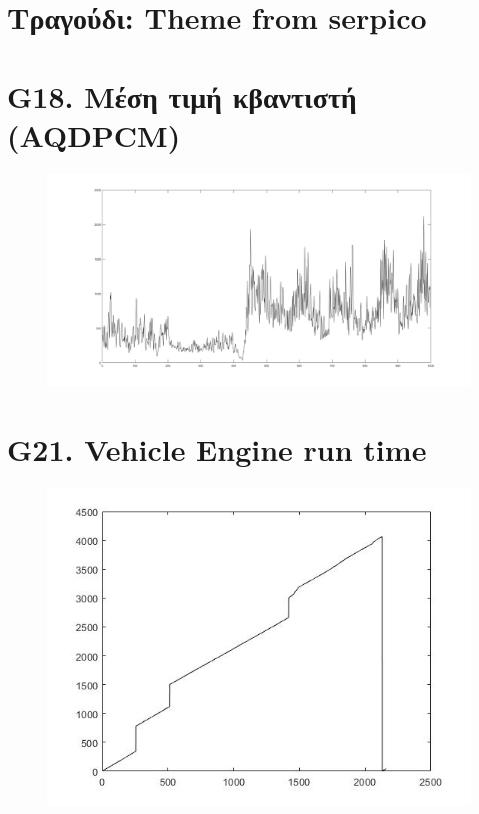 \documentclass{article}
\begin{document}
\section*{Τραγούδι: Theme from serpico}
\section*{G18. Μέση τιμή κβαντιστή (AQDPCM) }
\begin{figure}[h!]
 \begin{center}
 \advance\leftskip-6cm
  \includegraphics[width=230mm,scale=0.7]{g18s1.jpg}
\end{center}
\end{figure}
\newpage
\section*{G21. Vehicle Engine run time }
\begin{figure}[h!]
 \begin{center}
 \advance\leftskip-6cm
  \includegraphics[width=230mm,scale=0.7]{g21s1.jpg}
\end{center}
\end{figure}
\newpage
\end{document}
